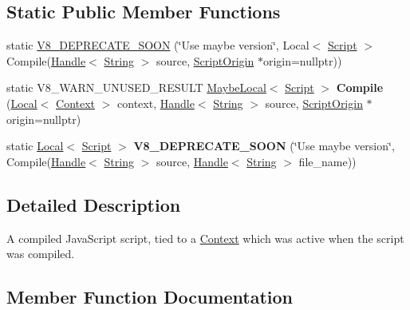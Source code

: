 \subsection*{Static Public Member Functions}
\begin{DoxyCompactItemize}
\item 
static \hyperlink{classv8_1_1_script_aee599c1c0b8779fec905e9ee79230cac}{V8\+\_\+\+D\+E\+P\+R\+E\+C\+A\+T\+E\+\_\+\+S\+O\+O\+N} (\char`\"{}Use maybe version\char`\"{}, Local$<$ \hyperlink{classv8_1_1_script}{Script} $>$ Compile(\hyperlink{classv8_1_1_local}{Handle}$<$ \hyperlink{classv8_1_1_string}{String} $>$ source, \hyperlink{classv8_1_1_script_origin}{Script\+Origin} $\ast$origin=nullptr))
\item 
\hypertarget{classv8_1_1_script_adfd76f63117ffaf0d7812fa22f583498}{}static V8\+\_\+\+W\+A\+R\+N\+\_\+\+U\+N\+U\+S\+E\+D\+\_\+\+R\+E\+S\+U\+L\+T \hyperlink{classv8_1_1_maybe_local}{Maybe\+Local}$<$ \hyperlink{classv8_1_1_script}{Script} $>$ {\bfseries Compile} (\hyperlink{classv8_1_1_local}{Local}$<$ \hyperlink{classv8_1_1_context}{Context} $>$ context, \hyperlink{classv8_1_1_local}{Handle}$<$ \hyperlink{classv8_1_1_string}{String} $>$ source, \hyperlink{classv8_1_1_script_origin}{Script\+Origin} $\ast$origin=nullptr)\label{classv8_1_1_script_adfd76f63117ffaf0d7812fa22f583498}

\item 
\hypertarget{classv8_1_1_script_aea507bc57c27f8495d285d1660755255}{}static \hyperlink{classv8_1_1_local}{Local}$<$ \hyperlink{classv8_1_1_script}{Script} $>$ {\bfseries V8\+\_\+\+D\+E\+P\+R\+E\+C\+A\+T\+E\+\_\+\+S\+O\+O\+N} (\char`\"{}Use maybe version\char`\"{}, Compile(\hyperlink{classv8_1_1_local}{Handle}$<$ \hyperlink{classv8_1_1_string}{String} $>$ source, \hyperlink{classv8_1_1_local}{Handle}$<$ \hyperlink{classv8_1_1_string}{String} $>$ file\+\_\+name))\label{classv8_1_1_script_aea507bc57c27f8495d285d1660755255}

\end{DoxyCompactItemize}


\subsection{Detailed Description}
A compiled Java\+Script script, tied to a \hyperlink{classv8_1_1_context}{Context} which was active when the script was compiled. 

\subsection{Member Function Documentation}
\hypertarget{classv8_1_1_script_afac25cad452a61897c375c2b881e2070}{}
